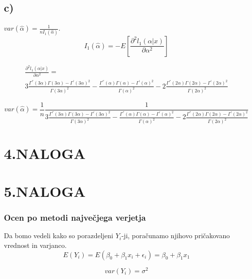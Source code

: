\documentclass{article}
\begin{document}
\subsection*{c)}
$var(\hat{\alpha}) = \frac{1}{nI_1(\hat{\alpha})}$.
\begin{equation*}
I_1(\hat{\alpha}) = -E\left[  \frac{\partial^2l_1(\alpha|x)}{\partial \alpha^2}   \right]
\end{equation*}

\begin{equation*}
\begin{split}
\frac{\partial^2l_1(\alpha|x)}{\partial \alpha^2} =\\  3\frac{\Gamma^{''}(3\alpha)\Gamma(3\alpha) - \Gamma^{'}(3\alpha)^2}{\Gamma(3\alpha)^2} -
\frac{\Gamma^{''}(\alpha)\Gamma(\alpha) - \Gamma^{'}(\alpha)^2}{\Gamma(\alpha)^2} -
2\frac{\Gamma^{''}(2\alpha)\Gamma(2\alpha) - \Gamma^{'}(2\alpha)^2}{\Gamma(2\alpha)^2}
\end{split}
\end{equation*}

\begin{equation*}
var(\hat{\alpha}) =\frac{1}{n} \frac{1}{ 3\frac{\Gamma^{''}(3\alpha)\Gamma(3\alpha) - \Gamma^{'}(3\alpha)^2}{\Gamma(3\alpha)^2} -
\frac{\Gamma^{''}(\alpha)\Gamma(\alpha) - \Gamma^{'}(\alpha)^2}{\Gamma(\alpha)^2} -
2\frac{\Gamma^{''}(2\alpha)\Gamma(2\alpha) - \Gamma^{'}(2\alpha)^2}{\Gamma(2\alpha)^2}}
\end{equation*}


\section*{4.NALOGA}

\section*{5.NALOGA}
\subsubsection*{Ocen po metodi največjega verjetja}
Da bomo vedeli kako so porazdeljeni $Y_i$-ji, poračunamo njihovo pričakovano vrednost in varjanco.
\begin{equation*}
E(Y_i) = E(\beta_0+\beta_1x_i+\epsilon_i) = \beta_0+\beta_1x_1
\end{equation*}

\begin{equation*}
var(Y_i) = \sigma^2
\end{equation*}
\end{document}
